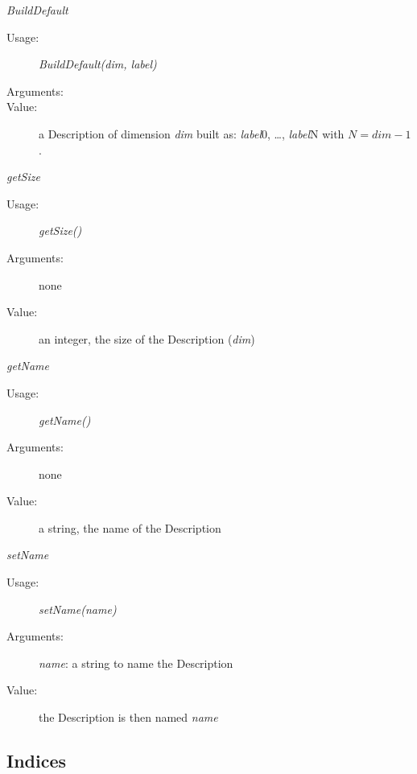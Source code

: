 \begin{description}
\begin{description}
\item \textit{BuildDefault}
\begin{description}
\item[Usage:] \textit{BuildDefault(dim, label)}
\item[Arguments:] \rule{0pt}{1em}
\item[Value:] a Description of dimension \textit{dim} built as: {\itshape label}0, \dots, {\itshape label}N with $N=dim-1$.
\end{description}
\bigskip

\item \textit{getSize}
\begin{description}
\item[Usage:] \textit{getSize()}
\item[Arguments:] none
\item[Value:] an integer, the size of the Description (\textit{dim})
\end{description}
\bigskip


\item \textit{getName}
\begin{description}
\item[Usage:] \textit{getName()}
\item[Arguments:] none
\item[Value:] a string, the name of the Description
\end{description}
\bigskip

\item \textit{setName}
\begin{description}
\item[Usage:] \textit{setName(name)}
\item[Arguments:] \textit{name}: a string to name the Description
\item[Value:] the Description is then named \textit{name}
\end{description}
\bigskip

\end{description}
\end{description}

\newpage
\subsection{Indices}

